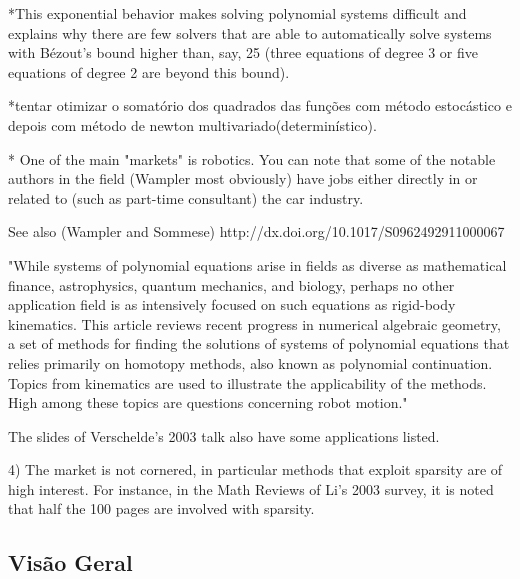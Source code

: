 *This exponential behavior makes solving polynomial systems difficult and explains why there are few solvers that are able to automatically solve systems with Bézout's bound higher than, say, 25 (three equations of degree 3 or five equations of degree 2 are beyond this bound).

*tentar otimizar o somatório dos quadrados das funções com método estocástico e depois com método de newton multivariado(determinístico).

* One of the main "markets" is robotics. You can note that some of the notable authors in the field (Wampler most obviously) have jobs either directly in or related to (such as part-time consultant) the car industry.

See also (Wampler and Sommese) http://dx.doi.org/10.1017/S0962492911000067

"While systems of polynomial equations arise in fields as diverse as mathematical finance, astrophysics, quantum mechanics, and biology, perhaps no other application field is as intensively focused on such equations as rigid-body kinematics. This article reviews recent progress in numerical algebraic geometry, a set of methods for finding the solutions of systems of polynomial equations that relies primarily on homotopy methods, also known as polynomial continuation. Topics from kinematics are used to illustrate the applicability of the methods. High among these topics are questions concerning robot motion."

The slides of Verschelde's 2003 talk also have some applications listed. %

4) The market is not cornered, in particular methods that exploit sparsity are of high interest. For instance, in the Math Reviews of Li's 2003 survey, it is noted that half the 100 pages are involved with sparsity. %

\subsection{Visão Geral}